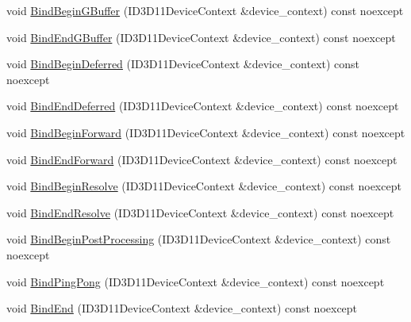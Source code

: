 \begin{DoxyCompactItemize}
\item 
void \hyperlink{classmage_1_1rendering_1_1_output_manager_a93139563e5f5b58ccba4688c3b793e32}{Bind\+Begin\+G\+Buffer} (I\+D3\+D11\+Device\+Context \&device\+\_\+context) const noexcept
\item 
void \hyperlink{classmage_1_1rendering_1_1_output_manager_a380113a2b1c9049cfd2367a6344683b7}{Bind\+End\+G\+Buffer} (I\+D3\+D11\+Device\+Context \&device\+\_\+context) const noexcept
\item 
void \hyperlink{classmage_1_1rendering_1_1_output_manager_ad05f55888d2075806ae7a381031ecdfd}{Bind\+Begin\+Deferred} (I\+D3\+D11\+Device\+Context \&device\+\_\+context) const noexcept
\item 
void \hyperlink{classmage_1_1rendering_1_1_output_manager_af48d4e2671d7b84d3fd94961b926dd2a}{Bind\+End\+Deferred} (I\+D3\+D11\+Device\+Context \&device\+\_\+context) const noexcept
\item 
void \hyperlink{classmage_1_1rendering_1_1_output_manager_a678b86feab6fffb88752254a799d456d}{Bind\+Begin\+Forward} (I\+D3\+D11\+Device\+Context \&device\+\_\+context) const noexcept
\item 
void \hyperlink{classmage_1_1rendering_1_1_output_manager_ad0b43f26a2762ae116bc72b0cf21a6de}{Bind\+End\+Forward} (I\+D3\+D11\+Device\+Context \&device\+\_\+context) const noexcept
\item 
void \hyperlink{classmage_1_1rendering_1_1_output_manager_affa0c4b4c9c56807fe8ad4ed802fdfd9}{Bind\+Begin\+Resolve} (I\+D3\+D11\+Device\+Context \&device\+\_\+context) const noexcept
\item 
void \hyperlink{classmage_1_1rendering_1_1_output_manager_a548e6003d34916b174f74f6f1b5e85a2}{Bind\+End\+Resolve} (I\+D3\+D11\+Device\+Context \&device\+\_\+context) const noexcept
\item 
void \hyperlink{classmage_1_1rendering_1_1_output_manager_a6c22d77a812e3eacf32cfdb6d6a4d5f4}{Bind\+Begin\+Post\+Processing} (I\+D3\+D11\+Device\+Context \&device\+\_\+context) const noexcept
\item 
void \hyperlink{classmage_1_1rendering_1_1_output_manager_aacb8da12f24fe9b7f1c3aac6f52ba9a1}{Bind\+Ping\+Pong} (I\+D3\+D11\+Device\+Context \&device\+\_\+context) const noexcept
\item 
void \hyperlink{classmage_1_1rendering_1_1_output_manager_adf8fa859bb168ecf389d56b574a69dbd}{Bind\+End} (I\+D3\+D11\+Device\+Context \&device\+\_\+context) const noexcept
\end{DoxyCompactItemize}
